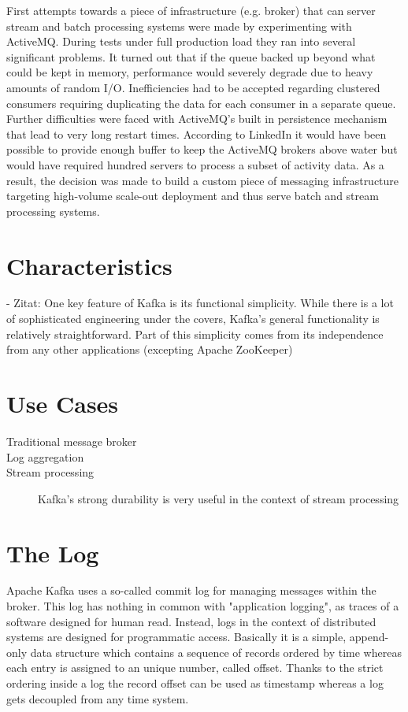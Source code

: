 First attempts towards a piece of infrastructure (e.g. broker) that can server
stream and batch processing systems were made by experimenting with
ActiveMQ\cite{activemq}. During tests under full production load they ran into
several significant problems. It turned out that if the queue backed up beyond what could
be kept in memory, performance would severely degrade due to heavy amounts of
random I/O. Inefficiencies had to be accepted regarding clustered consumers
requiring duplicating the data for each consumer in a separate queue. Further
difficulties were faced with ActiveMQ's built in persistence mechanism that lead
to very long restart times. 
According to LinkedIn it would have been possible to provide enough buffer to
keep the ActiveMQ brokers above water but would have required hundred servers to
process a subset of activity data. As a result, the decision was made to build a
custom piece of messaging infrastructure targeting high-volume scale-out
deployment and thus serve batch and stream processing systems. 
\cite{goodhope2012building}


\section{Characteristics}
- Zitat: One key feature of Kafka is its functional simplicity. While there is a
lot of sophisticated engineering under the covers, Kafka’s general functionality
is relatively straightforward. Part of this simplicity comes from its
independence from any other applications (excepting Apache ZooKeeper)

\section{Use Cases}
\begin{description}
    \item [Traditional message broker]
    \item [Log aggregation]
    \item [Stream processing] Kafka's strong durability is very useful in the
        context of stream processing
\end{description}

\section{The Log}
\label{intro-kafka-log}
Apache Kafka uses a so-called commit log for managing messages within the
broker. This log has nothing in common with "application logging", as traces of
a software designed for human read. Instead, logs in the context of distributed systems
are designed for programmatic access. Basically it is a simple, append-only data
structure which contains a sequence of records ordered by time whereas each
entry is assigned to an unique number, called offset. Thanks to the strict
ordering inside a log the record offset can be used as timestamp whereas a log
gets decoupled from any time system. \cite{apachekafka} \cite{JK-TheLog}

